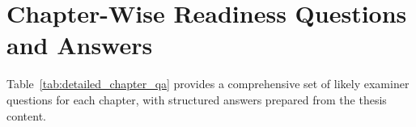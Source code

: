 
\label{tab:detailed_chapter_qa}

\iffalse %

\section*{Chapter-Wise Readiness Questions and Answers}

\noindent Table~\ref{tab:detailed_chapter_qa} provides a comprehensive set of likely examiner questions for each chapter, with structured answers prepared from the thesis content.

\renewcommand{\arraystretch}{1.15}

